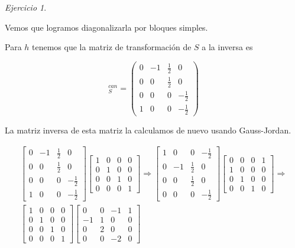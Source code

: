 \documentclass[11pt,a4paper]{article}
\theoremstyle{definition}
\theoremstyle{remark}
\newtheorem{exc}{Ejercicio}
\begin{document}
\begin{exc}
\begin{enumerate}
			Vemos que logramos diagonalizarla por bloques simples.
			
			Para $ h $ tenemos que la matriz de transformación de $ S $ a la inversa es
			
			\begin{equation}
			[id]_{S}^{can} = 
			\begin{pmatrix}
			0 & -1 & \frac{1}{2} & 0
			\\ 0 & 0 & \frac{1}{2} & 0
			\\ 0 & 0 & 0 & -\frac{1}{2}  
			\\ 1 & 0 & 0 & -\frac{1}{2}
			\end{pmatrix} \nonumber
			\end{equation}
			
			La matriz inversa de esta matriz la calculamos de nuevo usando Gauss-Jordan.
			
			\begin{multline}
			\begin{bmatrix}
			0 & -1 & \frac{1}{2} & 0
			\\ 0 & 0 & \frac{1}{2} & 0
			\\ 0 & 0 & 0 & -\frac{1}{2}  
			\\ 1 & 0 & 0 & -\frac{1}{2}
			\end{bmatrix}
			\begin{bmatrix}
			1 & 0 & 0 & 0
			\\ 0 & 1 & 0 & 0
			\\ 0 & 0 & 1 & 0  
			\\ 0 & 0 & 0 & 1
			\end{bmatrix} \nonumber \Rightarrow
			\begin{bmatrix}
			1 & 0 & 0 & -\frac{1}{2}
			\\ 0 & -1 & \frac{1}{2} & 0
			\\ 0 & 0 & \frac{1}{2} & 0
			\\ 0 & 0 & 0 & -\frac{1}{2}  
			\end{bmatrix}
			\begin{bmatrix}
			0 & 0 & 0 & 1
			\\ 1 & 0 & 0 & 0
			\\ 0 & 1 & 0 & 0
			\\ 0 & 0 & 1 & 0  		
			\end{bmatrix} \Rightarrow
			\\
			\begin{bmatrix}
			1 & 0 & 0 & 0
			\\ 0 & 1 & 0 & 0
			\\ 0 & 0 & 1 & 0
			\\ 0 & 0 & 0 & 1  
			\end{bmatrix}
			\begin{bmatrix}
	 		0 & 0 & -1 & 1
	 		\\ -1 & 1 & 0 & 0
	 		\\ 0 & 2 & 0 & 0
	 		\\ 0 & 0 & -2 & 0  		
	 		\end{bmatrix}
			\end{multline}
			

\end{enumerate}
\end{exc}
\end{document}
